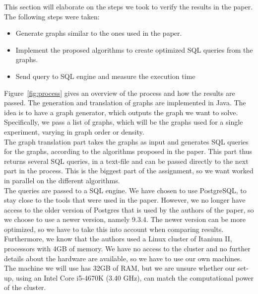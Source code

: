 This section will elaborate on the steps we took to verify the results in the paper. The following steps were taken:

\begin{itemize}
	\item Generate graphs similar to the ones used in the paper.
	\item Implement the proposed algorithms to create optimized SQL queries from the graphs.
	\item Send query to SQL engine and measure the execution time
\end{itemize}

\noindent Figure~\ref{fig:process} gives an overview of the process and how the results are passed. The generation and translation of graphs are implemented in Java. The idea is to have a graph generator, which outputs the graph we want to solve. Specifically, we pass a list of graphs, which will be the graphs used for a single experiment, varying in graph order or density. \\

The graph translation part takes the graphs as input and generates SQL queries for the graphs, according to the algorithms proposed in the paper. This part thus returns several SQL queries, in a text-file and can be passed directly to the next part in the process. This is the biggest part of the assignment, so we want worked in parallel on the different algorithms. \\

The queries are passed to a SQL engine. We have chosen to use PostgreSQL, to stay close to the tools that were used in the paper. However, we no longer have access to the older version of Postgres that is used by the authors of the paper, so we choose to use a newer version, namely 9.3.4. The newer version can be more optimized, so we have to take this into account when comparing results. Furthermore, we know that the authors used a Linux cluster of Itanium II, processors with 4GB of memory. We have no access to the cluster and no further details about the hardware are available, so we have to use our own machines. The machine we will use has 32GB of RAM, but we are unsure whether our set-up, using an Intel Core i5-4670K (3.40 GHz), can match the computational power of the cluster. 

